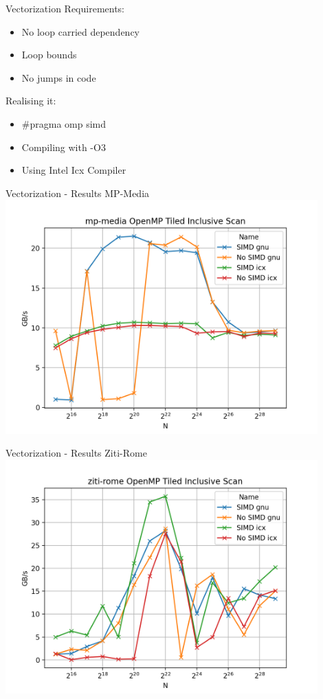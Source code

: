 \begin{frame}{Vectorization}
	Requirements:
	\begin{itemize}
		\item No loop carried dependency
		\item Loop bounds
		\item No jumps in code
	\end{itemize}
	
	Realising it:
	\begin{itemize}
		\item \#pragma omp simd
		\item Compiling with -O3
		\item Using Intel Icx Compiler
	\end{itemize}
\end{frame} 

\begin{frame}{Vectorization - Results MP-Media}
	\centering
	\vspace{-5pt}
	\includegraphics[width=0.90\textwidth]{graphs/mp-media OpenMP Tiled Inclusive Scan.png}
\end{frame}

\begin{frame}{Vectorization - Results Ziti-Rome}
	\centering
	\vspace{-5pt}
	\includegraphics[width=0.90\textwidth]{graphs/ziti-rome OpenMP Tiled Inclusive Scan.png}
\end{frame}
